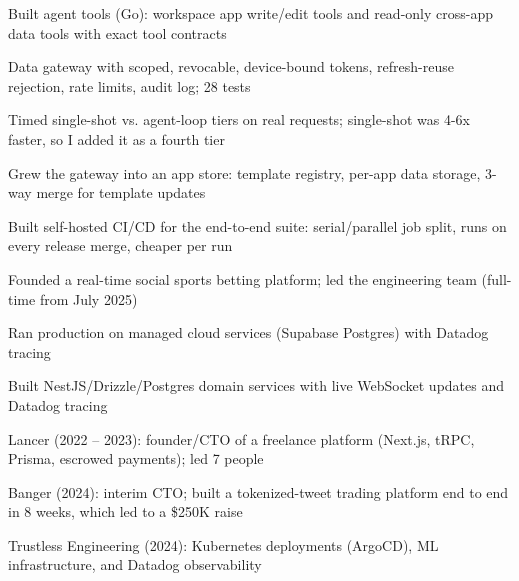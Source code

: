 \documentclass[print]{jack-resume}
\begin{document}
\begin{tightemize}
    \item Built agent tools (Go): workspace app write/edit tools and read-only cross-app data tools with exact tool contracts
    \item Data gateway with scoped, revocable, device-bound tokens, refresh-reuse rejection, rate limits, audit log; 28 tests
    \item Timed single-shot vs. agent-loop tiers on real requests; single-shot was 4-6x faster, so I added it as a fourth tier
    \item Grew the gateway into an app store: template registry, per-app data storage, 3-way merge for template updates
    \item Built self-hosted CI/CD for the end-to-end suite: serial/parallel job split, runs on every release merge, cheaper per run
\end{tightemize}
\sectionsep

\begin{tightemize}
    \item Founded a real-time social sports betting platform; led the engineering team (full-time from July 2025)
    \item Ran production on managed cloud services (Supabase Postgres) with Datadog tracing
    \item Built NestJS/Drizzle/Postgres domain services with live WebSocket updates and Datadog tracing
\end{tightemize}
\sectionsep

\begin{tightemize}
    \item Lancer (2022 -- 2023): founder/CTO of a freelance platform (Next.js, tRPC, Prisma, escrowed payments); led 7 people
    \item Banger (2024): interim CTO; built a tokenized-tweet trading platform end to end in 8 weeks, which led to a \$250K raise
    \item Trustless Engineering (2024): Kubernetes deployments (ArgoCD), ML infrastructure, and Datadog observability
\end{tightemize}
\sectionsep
\end{document}
